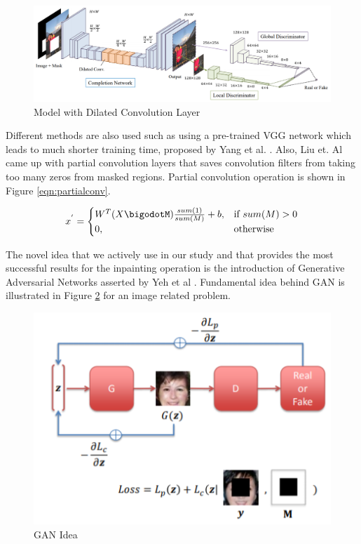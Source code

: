 \begin{figure}[h]
    \centering
    \includegraphics[scale=0.35]{figures/chapter4/Lizukaetal.PNG}
    \vspace*{5mm}
    \caption{Model with Dilated Convolution Layer \cite{dilated_conv}}
    \label{fig:dilated-model}
\end{figure}

Different methods are also used such as using a pre-trained VGG network which leads to much shorter training time, proposed by Yang et al. \cite{inpainting_neuralpatch}. Also, Liu et. Al \cite{richer_conv_edge} came up with partial convolution layers that saves convolution filters from taking too many zeros from masked regions. Partial convolution operation is shown in Figure \ref{eqn:partialconv}.

\begin{equation}
\label{eqn:partialconv}
    x^{'}= {
\begin{cases}
    W^T (X\bigodotM) \frac{sum(1)}{sum(M)}+b,& \text{if } sum(M) > 0\\
    0,              & \text{otherwise}
\end{cases}
}
\end{equation}

The novel idea that we actively use in our study and that provides the most successful results for the inpainting operation is the introduction of Generative Adversarial Networks asserted by Yeh et al \cite{semantic_inpainting_geneative}. Fundamental idea behind GAN is illustrated in Figure \ref{fig:gan-idedal} for an image related problem.

\begin{figure}[h]
    \centering
    \includegraphics[scale=0.7]{figures/chapter4/GANinpainting.PNG}
    \caption{GAN Idea \cite{semantic_inpainting_geneative}}
    \label{fig:gan-idedal}
\end{figure}

